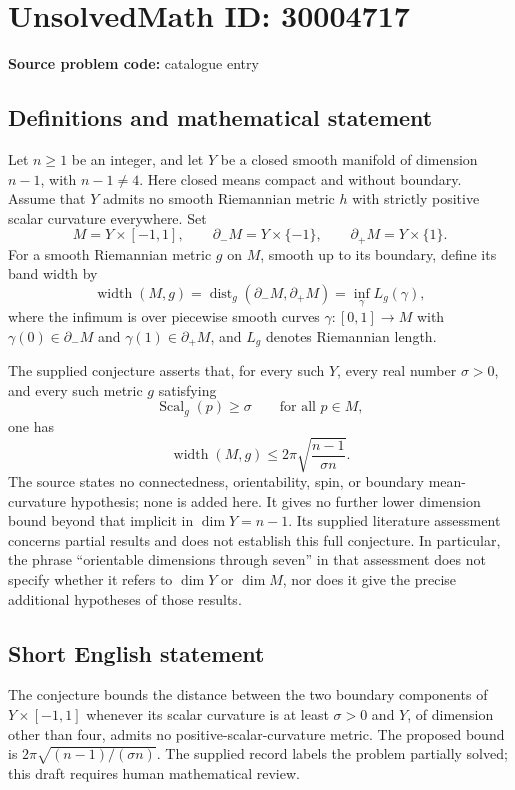 \documentclass[11pt]{article}
\begin{document}
\section*{UnsolvedMath ID: 30004717}
\textbf{Source problem code:} catalogue entry
\subsection{Definitions and mathematical statement}
Let \(n\geq 1\) be an integer, and let \(Y\) be a closed smooth manifold of dimension \(n-1\), with \(n-1\neq 4\). Here closed means compact and without boundary. Assume that \(Y\) admits no smooth Riemannian metric \(h\) with strictly positive scalar curvature everywhere. Set
\[
M=Y\times[-1,1],\qquad \partial_-M=Y\times\{-1\},\qquad \partial_+M=Y\times\{1\}.
\]
For a smooth Riemannian metric \(g\) on \(M\), smooth up to its boundary, define its band width by
\[
\operatorname{width}(M,g)=\operatorname{dist}_g(\partial_-M,\partial_+M)
=\inf_{\gamma} L_g(\gamma),
\]
where the infimum is over piecewise smooth curves \(\gamma:[0,1]\to M\) with \(\gamma(0)\in\partial_-M\) and \(\gamma(1)\in\partial_+M\), and \(L_g\) denotes Riemannian length.

The supplied conjecture asserts that, for every such \(Y\), every real number \(\sigma>0\), and every such metric \(g\) satisfying
\[
\operatorname{Scal}_g(p)\geq\sigma\qquad\text{for all }p\in M,
\]
one has
\[
\operatorname{width}(M,g)\leq 2\pi\sqrt{\frac{n-1}{\sigma n}}.
\]
The source states no connectedness, orientability, spin, or boundary mean-curvature hypothesis; none is added here. It gives no further lower dimension bound beyond that implicit in \(\dim Y=n-1\). Its supplied literature assessment concerns partial results and does not establish this full conjecture. In particular, the phrase ``orientable dimensions through seven'' in that assessment does not specify whether it refers to \(\dim Y\) or \(\dim M\), nor does it give the precise additional hypotheses of those results.
\subsection{Short English statement}
The conjecture bounds the distance between the two boundary components of \(Y\times[-1,1]\) whenever its scalar curvature is at least \(\sigma>0\) and \(Y\), of dimension other than four, admits no positive-scalar-curvature metric. The proposed bound is \(2\pi\sqrt{(n-1)/(\sigma n)}\). The supplied record labels the problem partially solved; this draft requires human mathematical review.
\end{document}
